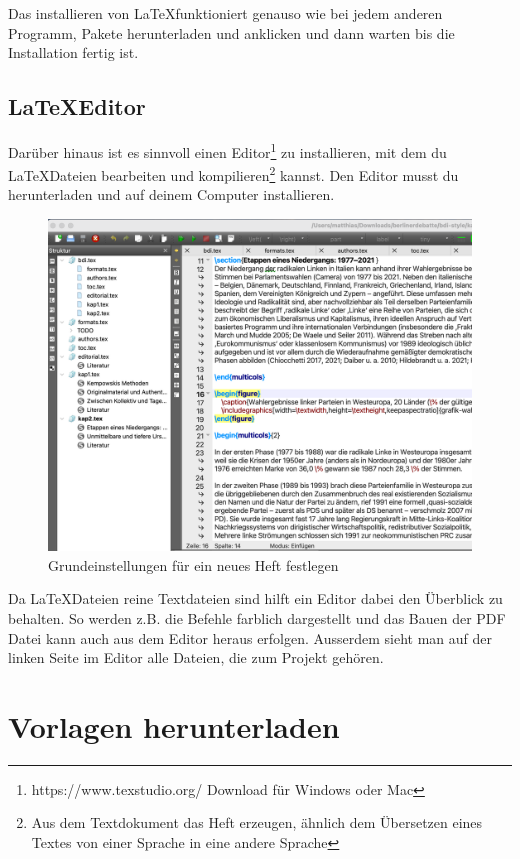 \documentclass{article}
\begin{document}
Das installieren von \LaTeX funktioniert genauso wie bei jedem anderen Programm, Pakete herunterladen und anklicken und dann warten bis die Installation fertig ist.

\subsection{\LaTeX Editor}

Darüber hinaus ist es sinnvoll einen Editor\footnote{https://www.texstudio.org/ Download für Windows oder Mac} zu installieren, mit dem du \LaTeX Dateien bearbeiten und kompilieren\footnote{Aus dem Textdokument das Heft erzeugen, ähnlich dem Übersetzen eines Textes von einer Sprache in eine andere Sprache} kannst. Den Editor musst du herunterladen und auf deinem Computer installieren.

\begin{figure}
    \centering
    \caption{Grundeinstellungen für ein neues Heft festlegen}
    \includegraphics[scale=0.3]{texstudio.png}
\end{figure}

Da \LaTeX Dateien reine Textdateien sind hilft ein Editor dabei den Überblick zu behalten. So werden z.B. die Befehle farblich dargestellt und das Bauen der PDF Datei kann auch aus dem Editor heraus erfolgen. Ausserdem sieht man auf der linken Seite im Editor alle Dateien, die zum Projekt gehören.

\section{Vorlagen herunterladen}
\end{document}
